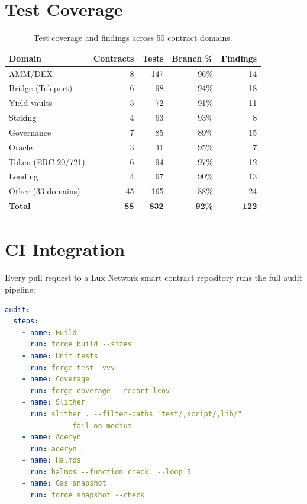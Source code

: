 \documentclass[11pt,a4paper]{article}
\begin{document}
\section{Test Coverage}

\begin{table}[H]
\centering
\small
\begin{tabular}{@{}lrrrr@{}}
\toprule
\textbf{Domain} & \textbf{Contracts} & \textbf{Tests} & \textbf{Branch \%} & \textbf{Findings} \\
\midrule
AMM/DEX & 8 & 147 & 96\% & 14 \\
Bridge (Teleport) & 6 & 98 & 94\% & 18 \\
Yield vaults & 5 & 72 & 91\% & 11 \\
Staking & 4 & 63 & 93\% & 8 \\
Governance & 7 & 85 & 89\% & 15 \\
Oracle & 3 & 41 & 95\% & 7 \\
Token (ERC-20/721) & 6 & 94 & 97\% & 12 \\
Lending & 4 & 67 & 90\% & 13 \\
Other (33 domains) & 45 & 165 & 88\% & 24 \\
\midrule
\textbf{Total} & \textbf{88} & \textbf{832} & \textbf{92\%} & \textbf{122} \\
\bottomrule
\end{tabular}
\caption{Test coverage and findings across 50 contract domains.}
\end{table}

\section{CI Integration}

Every pull request to a Lux Network smart contract repository runs the full audit pipeline:

\begin{lstlisting}[language=YAML,caption={CI audit pipeline}]
audit:
  steps:
    - name: Build
      run: forge build --sizes
    - name: Unit tests
      run: forge test -vvv
    - name: Coverage
      run: forge coverage --report lcov
    - name: Slither
      run: slither . --filter-paths "test/,script/,lib/"
              --fail-on medium
    - name: Aderyn
      run: aderyn .
    - name: Halmos
      run: halmos --function check_ --loop 5
    - name: Gas snapshot
      run: forge snapshot --check
\end{lstlisting}
\end{document}
